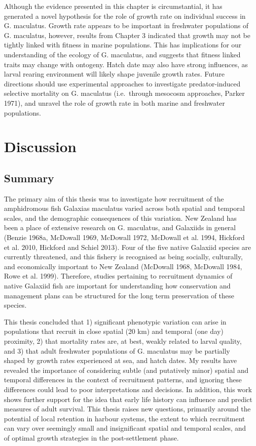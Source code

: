\documentclass[]{book}
\begin{document}
Although the evidence presented in this chapter is circumstantial, it
has generated a novel hypothesis for the role of growth rate on
individual success in G. maculatus. Growth rate appears to be important
in freshwater populations of G. maculatus, however, results from Chapter
3 indicated that growth may not be tightly linked with fitness in marine
populations. This has implications for our understanding of the ecology
of G. maculatus, and suggests that fitness linked traits may change with
ontogeny. Hatch date may also have strong influences, as larval rearing
environment will likely shape juvenile growth rates. Future directions
should use experimental approaches to investigate predator-induced
selective mortality on G. maculatus (i.e.~through mesocosm approaches,
Parker 1971), and unravel the role of growth rate in both marine and
freshwater populations.

\chapter{Discussion}\label{discussion-3}

\section{Summary}\label{summary}

The primary aim of this thesis was to investigate how recruitment of the
amphidromous fish Galaxias maculatus varied across both spatial and
temporal scales, and the demographic consequences of this variation. New
Zealand has been a place of extensive research on G. maculatus, and
Galaxiids in general (Benzie 1968a, McDowall 1969, McDowall 1972,
McDowall et al. 1994, Hickford et al. 2010, Hickford and Schiel 2013).
Four of the five native Galaxiid species are currently threatened, and
this fishery is recognised as being socially, culturally, and
economically important to New Zealand (McDowall 1968, McDowall 1984,
Rowe et al. 1999). Therefore, studies pertaining to recruitment dynamics
of native Galaxiid fish are important for understanding how conservation
and management plans can be structured for the long term preservation of
these species.

This thesis concluded that 1) significant phenotypic variation can arise
in populations that recruit in close spatial (20 km) and temporal (one
day) proximity, 2) that mortality rates are, at best, weakly related to
larval quality, and 3) that adult freshwater populations of G. maculatus
may be partially shaped by growth rates experienced at sea, and hatch
dates. My results have revealed the importance of considering subtle
(and putatively minor) spatial and temporal differences in the context
of recruitment patterns, and ignoring these differences could lead to
poor interpretations and decisions. In addition, this work shows further
support for the idea that early life history can influence and predict
measures of adult survival. This thesis raises new questions, primarily
around the potential of local retention in harbour systems, the extent
to which recruitment can vary over seemingly small and insignificant
spatial and temporal scales, and of optimal growth strategies in the
post-settlement phase.
\end{document}
